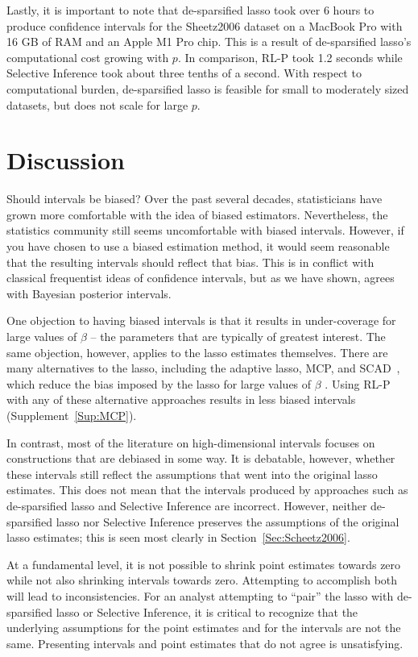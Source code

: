 Lastly, it is important to note that de-sparsified lasso took over 6 hours to produce confidence intervals for the Sheetz2006 dataset on a MacBook Pro with 16 GB of RAM and an Apple M1 Pro chip. This is a result of de-sparsified lasso's computational cost growing with $p$. In comparison, RL-P took 1.2 seconds while Selective Inference took about three tenths of a second. With respect to computational burden, de-sparsified lasso is feasible for small to moderately sized datasets, but does not scale for large $p$.


\section{Discussion} \label{Sec:discussion}

Should intervals be biased? Over the past several decades, statisticians have grown more comfortable with the idea of biased estimators. Nevertheless, the statistics community still seems uncomfortable with biased intervals. However, if you have chosen to use a biased estimation method, it would seem reasonable that the resulting intervals should reflect that bias. This is in conflict with classical frequentist ideas of confidence intervals, but as we have shown, agrees with Bayesian posterior intervals.

One objection to having biased intervals is that it results in under-coverage for large values of $\beta$ -- the parameters that are typically of greatest interest. The same objection, however, applies to the lasso estimates themselves. There are many alternatives to the lasso, including the adaptive lasso, MCP, and SCAD , which reduce the bias imposed by the lasso for large values of $\beta$ \citep{Zou2006, Zhang2010, Fan2001}. Using RL-P with any of these alternative approaches results in less biased intervals (Supplement~\ref{Sup:MCP}).

In contrast, most of the literature on high-dimensional intervals focuses on constructions that are debiased in some way. It is debatable, however, whether these intervals still reflect the assumptions that went into the original lasso estimates. This does not mean that the intervals produced by approaches such as de-sparsified lasso and Selective Inference are incorrect. However, neither de-sparsified lasso nor Selective Inference preserves the assumptions of the original lasso estimates; this is seen most clearly in Section~\ref{Sec:Scheetz2006}.

At a fundamental level, it is not possible to shrink point estimates towards zero while not also shrinking intervals towards zero. Attempting to accomplish both will lead to inconsistencies. For an analyst attempting to ``pair'' the lasso with de-sparsified lasso or Selective Inference, it is critical to recognize that the underlying assumptions for the point estimates and for the intervals are not the same. Presenting intervals and point estimates that do not agree is unsatisfying.

